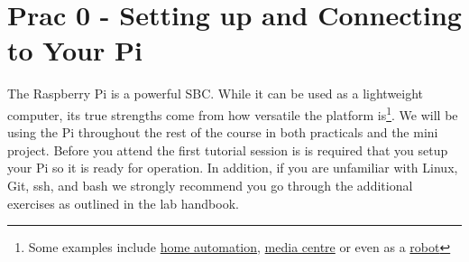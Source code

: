 \newpage
\setcounter{section}{-1}
\section{Prac 0 - Setting up and Connecting to Your Pi}
The Raspberry Pi is a powerful SBC. While it can be used as a lightweight computer, its true strengths come from how versatile the platform is\footnote{Some examples include \href{https://www.home-assistant.io/hassio/}{home automation}, \href{https://xbian.org/getting-started/}{media centre} or even as a \href{https://github.com/takyonxxx/BalanceRobot-Raspberry-Pi}{robot}}.  We will be using the Pi throughout the rest of the course in both practicals and the mini project.  Before you attend the first tutorial session is is required that you setup your Pi so it is ready for operation.  In addition, if you are unfamiliar with Linux, Git, ssh, and bash we strongly recommend you go through the additional exercises as outlined in the lab handbook.

